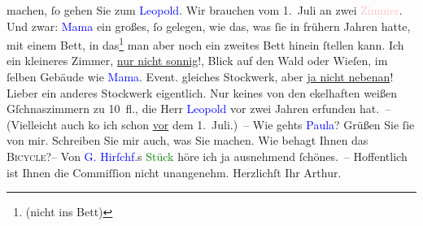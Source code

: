                machen, ſo gehen Sie zum \textcolor{pink}{\textcolor{blue}{Leopold}{}\ledrightnote{\textcolor{blue}{Leopold Petter}}}{}\ledrightnote{\textcolor{pink}{Hotel und Pension Rudolfshöhe (Leopold Petter)}}. Wir brauchen vom 1. Juli an zwei \textcolor{pink}{Zimmer}{}. Und zwar: \textcolor{blue}{Mama}{} ein großes, ſo gelegen, wie das, was ſie in frühern
               Jahren hatte, mit einem Bett, in das\footnote{\noindent{}(nicht ins Bett)} man aber noch ein zweites Bett hinein ſtellen kann. Ich ein kleineres
               Zimmer, \uline{nur nicht sonnig}!, Blick auf den Wald oder
               Wieſen, im ſelben Gebäude wie \textcolor{blue}{Mama}{}. Event. gleiches Stockwerk, aber \uline{ja nicht
                  nebenan}! Lieber ein anderes Stockwerk eigentlich. Nur keines von den
               ekelhaften weißen Gſchnaszimmern zu 10 fl., die Herr \textcolor{blue}{Leopold}{}\ledrightnote{\textcolor{blue}{Leopold Petter}} vor {\pb}zwei Jahren erfunden hat. –
               (Vielleicht auch ko{\geminationm} ich schon \uline{vor} dem 1. Juli.) –\pend
           \pstart
           Wie gehts \textcolor{blue}{Paula}{}\ledrightnote{\textcolor{blue}{Paula Beer-Hofmann}}? Grüßen Sie ſie von mir.\pend
           \pstart
           Schreiben Sie mir auch, was Sie machen. Wie behagt Ihnen das \textsc{Bicycle}?–\pend
           \pstart
           Von \textcolor{blue}{G. Hirſchf.}{}\ledrightnote{\textcolor{blue}{Georg Hirschfeld}}s \textcolor{green}{Stück}{} höre ich ja ausnehmend ſchönes. –\pend
           \pstart
           Hoffentlich ist Ihnen die Commiſſion nicht unangenehm.\pend
           \pstart Herzlichſt Ihr \spacefill\mbox{Arthur.}\pend{}\endnumbering{}  
      